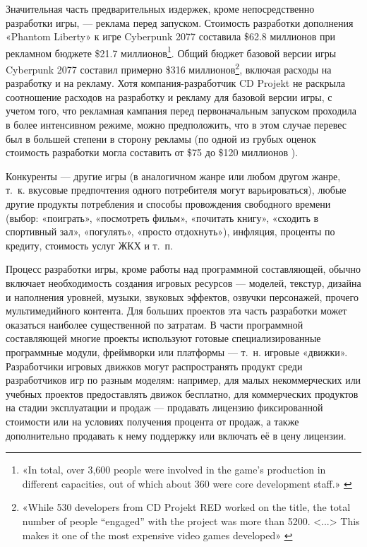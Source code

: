 \documentclass{article}
\begin{document}
Значительная часть предварительных издержек, кроме непосредственно разработки игры, — реклама перед запуском. Стоимость разработки дополнения «Phantom Liberty» к игре Cyberpunk 2077 составила \$62.8 миллионов при рекламном бюджете \$21.7 миллионов\footnote{«In total, over 3,600 people were involved in the game’s production in different capacities, out of which about 360 were core development staff.» \cite{cyberpunkMarketingBudget}}. Общий бюджет базовой версии игры Cyberpunk 2077 составил примерно \$316 миллионов\footnote{«While 530 developers from CD Projekt RED worked on the title, the total number of people “engaged” with the project was more than 5200. <...> This makes it one of the most expensive video games developed» \cite{cyberpunkTotalBudget}}, включая расходы на разработку и на рекламу. Хотя компания-разработчик CD Projekt не раскрыла соотношение расходов на разработку и рекламу для базовой версии игры, с учетом того, что рекламная кампания перед первоначальным запуском проходила в более интенсивном режиме, можно предположить, что в этом случае перевес был в большей степени в сторону рекламы (по одной из грубых оценок стоимость разработки могла составить от \$75 до \$120 миллионов \cite{cyberpunkDevBudgetEstimate}).

Конкуренты — другие игры (в аналогичном жанре или любом другом жанре, т.~к. вкусовые предпочтения одного потребителя могут варьироваться), любые другие продукты потребления и способы провождения свободного времени (выбор: «поиграть», «посмотреть фильм», «почитать книгу», «сходить в спортивный зал», «погулять», «просто отдохнуть»), инфляция, проценты по кредиту, стоимость услуг ЖКХ и т.~п.

Процесс разработки игры, кроме работы над программной составляющей, обычно включает необходимость создания игровых ресурсов — моделей, текстур, дизайна и наполнения уровней, музыки, звуковых эффектов, озвучки персонажей, прочего мультимедийного контента. Для больших проектов эта часть разработки может оказаться наиболее существенной по затратам. В части программной составляющей многие проекты используют готовые специализированные программные модули, фреймворки или платформы — т.~н. игровые «движки». Разработчики игровых движков могут распространять продукт среди разработчиков игр по разным моделям: например, для малых некоммерческих или учебных проектов предоставлять движок бесплатно, для коммерческих продуктов на стадии эксплуатации и продаж — продавать лицензию фиксированной стоимости или на условиях получения процента от продаж, а также дополнительно продавать к нему поддержку или включать её в цену лицензии.
\end{document}
